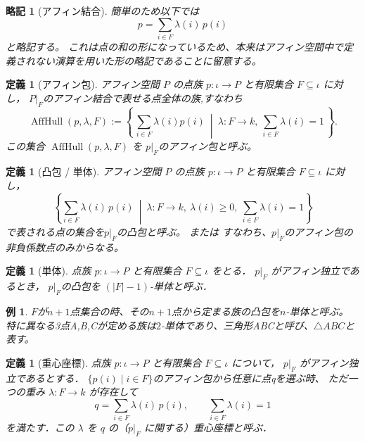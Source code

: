 \documentclass[a4paper,12pt]{bxjsbook}
\theoremstyle{theorem}
\newtheorem{definition}[theorem]{定義}
\newtheorem{example}[theorem]{例}
\newtheorem{abbreviation}[theorem]{略記}
\DeclareMathOperator{\AffHull}{AffHull}
\begin{document}
  \begin{abbreviation}[アフィン結合]
    簡単のため以下では
    \[
        p = \sum_{i\in F}\lambda(i)\, p(i)
    \]
    と略記する。
    これは点の和の形になっているため、本来はアフィン空間中で定義されない演算を用いた形の略記であることに留意する。
  \end{abbreviation}

  \begin{definition}[アフィン包]
      アフィン空間 $P$ の点族 $p:\iota \to P$ と有限集合 $F\subseteq \iota$ に対し，
      $P|_F$のアフィン結合で表せる点全体の族,すなわち
      \[
      \AffHull(p,\lambda,F)
      :=\left\{\,
      \sum_{i\in F}\lambda(i) p(i)
      \ \middle|\
      \lambda : F \to k,\ \sum_{i\in F}\lambda(i)=1
      \,\right\}.
      \]
      この集合 $\AffHull(p,\lambda,F)$ を $p|_F$の\emph{アフィン包}と呼ぶ。
  \end{definition}

  \begin{definition}[凸包 / 単体]
      アフィン空間 $P$ の点族 $p:\iota \to P$ と有限集合 $F\subseteq \iota$ に対し，
      \[
          \left\{
              \sum_{i\in F} \lambda(i)\,p(i)
              \ \middle|\ 
              \lambda:F\to k,\ \lambda(i)\ge 0,\ \sum_{i\in F}\lambda(i)=1
          \right\}
      \]
      で表される点の集合を$p|_F$の\emph{凸包}と呼ぶ。
      または
      すなわち、$p|_F$のアフィン包の非負係数点のみからなる。
  \end{definition}

  \begin{definition}[単体]
      点族 $p:\iota \to P$ と有限集合 $F\subseteq \iota$ をとる．
      $p|_F$ がアフィン独立であるとき，
      $p|_F$の凸包を \emph{$(|F|-1)$-単体}と呼ぶ．
  \end{definition}    

  \begin{example}
      $F$が$n+1$点集合の時、その$n+1$点から定まる族の凸包を$n$-単体と呼ぶ。
      特に異なる3点A,B,Cが定める族は$2$-単体であり、\emph{三角形ABC}と呼び、$\triangle ABC$と表す。
  \end{example}

  \begin{definition}[重心座標]
      点族 $p:\iota \to P$ と有限集合 $F\subseteq \iota$ について，
      $p|_F$ がアフィン独立であるとする．
      $\{p(i)\mid i\in F\}$の\emph{アフィン包}から任意に点qを選ぶ時、
      ただ一つの重み $\lambda:F\to k$ が存在して
      \[
          q=\sum_{i\in F}\lambda(i)\,p(i),\qquad \sum_{i\in F}\lambda(i)=1
      \]
      を満たす．この $\lambda$ を $q$ の（$p|_F$ に関する）\emph{重心座標}と呼ぶ．
  \end{definition}
\end{document}
